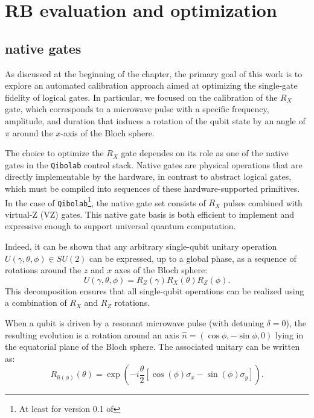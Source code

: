 \section{RB evaluation and optimization}

\subsection{\Qibolab native gates}
As discussed at the beginning of the chapter, the primary goal of this work is to explore an automated calibration approach aimed at optimizing the single-gate fidelity of logical gates. 
In particular, we focused on the calibration of the $R_X$ gate, which corresponds to a microwave pulse with a specific frequency, amplitude, and duration that induces a rotation of the qubit state by an angle of $\pi$ around the $x$-axis of the Bloch sphere.

The choice to optimize the $R_X$ gate dependes on its role as one of the native gates in the \texttt{Qibolab} control stack. 
Native gates are physical operations that are directly implementable by the hardware, in contrast to abstract logical gates, which must be compiled into sequences of these hardware-supported primitives. 
In the case of \texttt{Qibolab}\footnote{At least for version 0.1 of \Qibolab}, the native gate set consists of $R_X$ pulses combined with virtual-Z (VZ) gates. 
This native gate basis is both efficient to implement and expressive enough to support universal quantum computation.

Indeed, it can be shown that any arbitrary single-qubit unitary operation $ U(\gamma, \theta, \phi) \in SU(2) $ can be expressed, up to a global phase, as a sequence of rotations around the $z$ and $x$ axes of the Bloch sphere:
\begin{equation}
U(\gamma, \theta, \phi) = R_Z(\gamma) R_X(\theta) R_Z(\phi).
\end{equation}
This decomposition ensures that all single-qubit operations can be realized using a combination of $ R_X $ and $ R_Z $ rotations. 

When a qubit is driven by a resonant microwave pulse (with detuning $ \delta = 0 $), the resulting evolution is a rotation around an axis $\hat{n} = (\cos\phi, -\sin\phi, 0)$ lying in the equatorial plane of the Bloch sphere. 
The associated unitary can be written as:
\begin{equation}
R_{\hat{n}(\phi)}(\theta) = \exp\left( -i \frac{\theta}{2} \left[ \cos(\phi)\sigma_x - \sin(\phi)\sigma_y \right] \right).
\end{equation}

